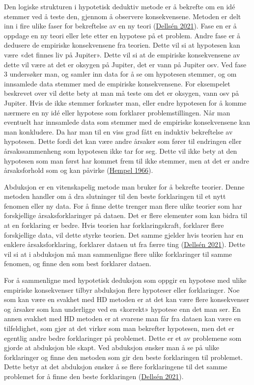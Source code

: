 \documentclass[
]{book}
\begin{document}
Den logiske strukturen i hypotetisk deduktiv metode er å bekrefte om en
idé stemmer ved å teste den, gjennom å observere konsekvensene. Metoden
er delt inn i fire ulike faser for bekreftelse av en ny teori
(\protect\hyperlink{ref-dellsuxe9n2021}{Dellsén 2021}). Fase en er å
oppdage en ny teori eller lete etter en hypotese på et problem. Andre
fase er å dedusere de empiriske konsekvensene fra teorien. Dette vil si
at hypotesen kan være «det finnes liv på Jupiter». Dette vil si at de
empiriske konsekvensene av dette vil være at det er oksygen på Jupiter,
det er vann på Jupiter osv. Ved fase 3 undersøker man, og samler inn
data for å se om hypotesen stemmer, og om innsamlede data stemmer med de
empiriske konsekvensene. For eksempelet beskrevet over vil dette bety at
man må teste om det er oksygen, vann osv på Jupiter. Hvis de ikke
stemmer forkaster man, eller endre hypotesen for å komme nærmere en ny
idé eller hypotese som forklarer problemstillingen. Når man eventuelt
har innsamlede data som stemmer med de empiriske konsekvensene kan man
konkludere. Da har man til en viss grad fått en induktiv bekreftelse av
hypotesen. Dette fordi det kan være andre årsaker som fører til
endringen eller årsakssammenheng som hypotesen ikke tar for seg. Dette
vil ikke bety at den hypotesen som man først har kommet frem til ikke
stemmer, men at det er andre årsaksforhold som og kan påvirke
(\protect\hyperlink{ref-hempel1966}{Hempel 1966}).

Abduksjon er en vitenskapelig metode man bruker for å bekrefte teorier.
Denne metoden handler om å dra slutninger til den beste forklaringen til
et nytt fenomen eller ny data. For å finne dette trenger man flere ulike
teorier som har forskjellige årsaksforklaringer på dataen. Det er flere
elementer som kan bidra til at en forklaring er bedre. Hvis teorien har
forklaringskraft, forklarer flere forskjellige data, vil dette styrke
teorien. Det samme gjelder hvis teorien har en enklere årsaksforklaring,
forklarer dataen ut fra færre ting
(\protect\hyperlink{ref-dellsuxe9n2021}{Dellsén 2021}). Dette vil si at
i abduksjon må man sammenligne flere ulike forklaringer til samme
fenomen, og finne den som best forklarer dataen.

For å sammenligne med hypotetisk deduksjon som oppgir en hypotese med
ulike empiriske konsekvenser tilbyr abduksjon flere hypoteser eller
forklaringer. Noe som kan være en svakhet med HD metoden er at det kan
være flere konsekvenser og årsaker som kan underligge ved en «korrekt»
hypotese enn det man ser. En annen svakhet med HD metoden er at svarene
man får fra dataen kan være en tilfeldighet, som gjør at det virker som
man bekrefter hypotesen, men det er egentlig andre bedre forklaringer på
problemet. Dette er et av problemene som gjorde at abduksjon ble skapt.
Ved abduksjon ønsker man å se på ulike forklaringer og finne den metoden
som gir den beste forklaringen til problemet. Dette betyr at det
abduksjon ønsker å se flere forklaringene til det samme problemet for å
finne den beste forklaringen
(\protect\hyperlink{ref-dellsuxe9n2021}{Dellsén 2021}).
\end{document}
